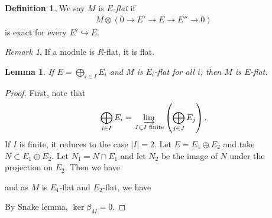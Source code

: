 \documentclass[12pt]{report}
\theoremstyle{plain}
\newtheorem{lemma}[theorem]{Lemma}
\theoremstyle{remark}
\newtheorem*{remark}{Remark}
\theoremstyle{definition}
\newtheorem{definition}[theorem]{Definition}
\begin{document}
\begin{definition}
    We say $M$ is \emph{$E$-flat} if
    \begin{align*}
        M\otimes(0\to E'\to E\to E''\to 0)
    \end{align*}
    is exact for every $E'\hookrightarrow E$.
\end{definition}
\begin{remark}
    If a module is $R$-flat, it is flat.
\end{remark}

\begin{lemma}
    If $E=\bigoplus_{i\in I} E_i$ and $M$ is $E_i$-flat for all $i$, then $M$ is $E$-flat.
\end{lemma}
\begin{proof}
    First, note that
    \begin{align*}
        \bigoplus_{i\in I} E_i = \varinjlim_{J\subset I\text{ finite}} \left(\bigoplus_{j\in J}E_j\right).
    \end{align*}
    If $I$ is finite, it reduces to the case $|I|=2$. Let $E=E_1\oplus E_2$ and take $N\subset E_1\oplus E_2$. Let $N_1=N\cap E_1$ and let $N_2$ be the image of $N$ under the projection on $E_2$. Then we have
    \begin{figure}[H]
        \centering
    \end{figure}
    \noindent and as $M$ is $E_1$-flat and $E_2$-flat, we have
    \begin{figure}[H]
        \centering
    \end{figure}
    \noindent By Snake lemma, $\ker \beta_M=0$.
\end{proof}
\end{document}
